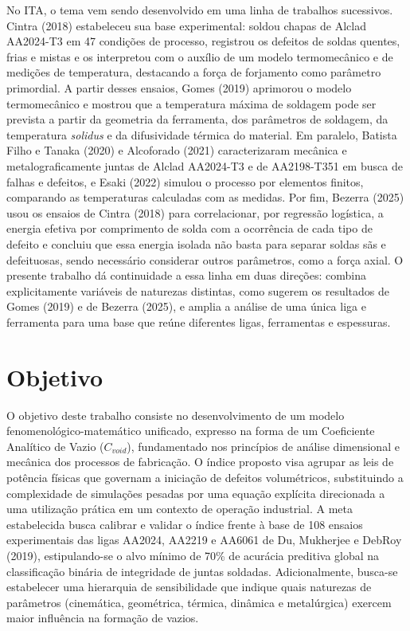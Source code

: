 \documentclass[12pt,openany]{report}
\begin{document}
No ITA, o tema vem sendo desenvolvido em uma linha de trabalhos sucessivos. Cintra (2018) estabeleceu sua base experimental: soldou chapas de Alclad AA2024-T3 em 47 condições de processo, registrou os defeitos de soldas quentes, frias e mistas e os interpretou com o auxílio de um modelo termomecânico e de medições de temperatura, destacando a força de forjamento como parâmetro primordial. A partir desses ensaios, Gomes (2019) aprimorou o modelo termomecânico e mostrou que a temperatura máxima de soldagem pode ser prevista a partir da geometria da ferramenta, dos parâmetros de soldagem, da temperatura \textit{solidus} e da difusividade térmica do material. Em paralelo, Batista Filho e Tanaka (2020) e Alcoforado (2021) caracterizaram mecânica e metalograficamente juntas de Alclad AA2024-T3 e de AA2198-T351 em busca de falhas e defeitos, e Esaki (2022) simulou o processo por elementos finitos, comparando as temperaturas calculadas com as medidas. Por fim, Bezerra (2025) usou os ensaios de Cintra (2018) para correlacionar, por regressão logística, a energia efetiva por comprimento de solda com a ocorrência de cada tipo de defeito e concluiu que essa energia isolada não basta para separar soldas sãs e defeituosas, sendo necessário considerar outros parâmetros, como a força axial. O presente trabalho dá continuidade a essa linha em duas direções: combina explicitamente variáveis de naturezas distintas, como sugerem os resultados de Gomes (2019) e de Bezerra (2025), e amplia a análise de uma única liga e ferramenta para uma base que reúne diferentes ligas, ferramentas e espessuras.

\section{Objetivo}

O objetivo deste trabalho consiste no desenvolvimento de um modelo fenomenológico\hyp{}matemático unificado, expresso na forma de um Coeficiente Analítico de Vazio ($C_{void}$), fundamentado nos princípios de análise dimensional e mecânica dos processos de fabricação. O índice proposto visa agrupar as leis de potência físicas que governam a iniciação de defeitos volumétricos, substituindo a complexidade de simulações pesadas por uma equação explícita direcionada a uma utilização prática em um contexto de operação industrial. A meta estabelecida busca calibrar e validar o índice frente à base de 108 ensaios experimentais das ligas AA2024, AA2219 e AA6061 de Du, Mukherjee e DebRoy (2019), estipulando-se o alvo mínimo de 70\% de acurácia preditiva global na classificação binária de integridade de juntas soldadas. Adicionalmente, busca-se estabelecer uma hierarquia de sensibilidade que indique quais naturezas de parâmetros (cinemática, geométrica, térmica, dinâmica e metalúrgica) exercem maior influência na formação de vazios.
\end{document}
